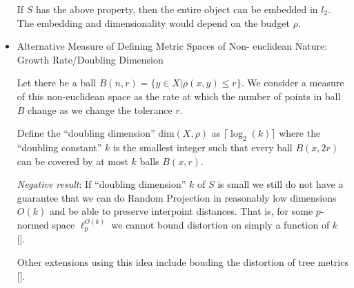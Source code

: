 \begin{itemize}
If $S$ has the above property, then the entire object can be embedded in $l_2$. The embedding and dimensionality would depend on the budget $\rho$.


\item Alternative Measure of Defining Metric Spaces of Non-
euclidean Nature: Growth Rate/Doubling Dimension


Let there be a ball $B(n,r) = \{y \in X | \rho(x,y) \leq r\}$. 
We consider a measure of this non-euclidean space as the rate 
at which the number of points in ball $B$ change as we change 
the tolerance $r$. 

Define the ``doubling dimension'' $\text{dim}(X,\rho)$ as 
$\lceil \log_2(k) \rceil$ where the ``doubling constant'' $k$ 
is the smallest integer such that every ball $B(x, 2r)$ can be 
covered by at most $k$ balls $B(x, r)$. 
    
\textit{Negative result}: If ``doubling dimension'' $k$ of $S$ is small we still
 do not have a guarantee that we can do Random Projection in reasonably low 
 dimensions $O(k)$ and be able to preserve interpoint distances. That is, for 
 some $p$-normed space $\ell_p^{O(k)}$ we cannot bound distortion on simply a 
 function of $k$ [\cite{doubling}].

Other extensions using this idea include bouding the distortion of tree metrics [\cite{boundedgeometries}].


\end{itemize}

